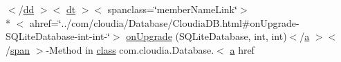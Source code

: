 \begin{DoxyCompactItemize}
\item 
$<$/\hyperlink{stylesheet_8css_a47f4718a86835a7771ec592ece845221}{dd} $>$$<$ \hyperlink{stylesheet_8css_a107565fb4039d33b041380d6e0ea1d80}{dt} $>$$<$ spanclass=\char`\"{}member\-Name\-Link\char`\"{}$>$\\*
$<$ ahref=\char`\"{}../com/cloudia/Database/Cloudia\-D\-B.\-html\#on\-Upgrade-\/S\-Q\-Lite\-Database-\/int-\/int-\/\char`\"{}$>$ \hyperlink{index-13_8html_a84a7c4d386aa4c5d021f582724e74f4d}{on\-Upgrade} (S\-Q\-Lite\-Database, int, int)$<$/\hyperlink{style_8css_a5e8981582017bb8b84c21f148345d1f7}{a} $>$$<$/\hyperlink{stylesheet_8css_a8343996ebcf16220b04e54659aac31cc}{span} $>$-\/Method in \hyperlink{_tools_8html_acf06f836132665ba8114f5a414c2403f}{class} com.\-cloudia.\-Database.$<$ \hyperlink{style_8css_a5e8981582017bb8b84c21f148345d1f7}{a} href
\end{DoxyCompactItemize}

